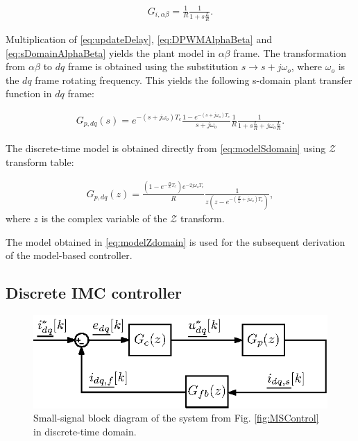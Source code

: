 \documentclass[conference]{IEEEtran}
\begin{document}
\begin{equation}
\begin{aligned}
G_{i,\alpha \beta} = \frac{1}{R} \frac{1}{1 + s \frac{L}{R}}.
\label{eq:sDomainAlphaBeta} 
\end{aligned}    
\end{equation}

Multiplication of \eqref{eq:updateDelay}, \eqref{eq:DPWMAlphaBeta} and \eqref{eq:sDomainAlphaBeta} yields the plant model in $\alpha \beta$ frame.
The transformation from $\alpha \beta$ to $dq$ frame is obtained using the substitution $s \rightarrow s + j \omega_o$, where $\omega_o$ is the $dq$ frame rotating frequency.
This yields the following s-domain plant transfer function in $dq$ frame:

\begin{equation}
\begin{aligned}
G_{p,dq}(s) = e^{-(s+j\omega_o) T_c} \frac{1-e^{-(s+j\omega_o) T_c}}{s+j\omega_o} \frac{1}{R} \frac{1}{1 + s \frac{L}{R} + j\omega_o \frac{L}{R}}.
\label{eq:modelSdomain} 
\end{aligned}    
\end{equation}
 
The discrete-time model is obtained directly from \eqref{eq:modelSdomain} using $\mathcal{Z}$ transform table:

\begin{equation}
\begin{aligned}
G_{p,dq}(z) = \frac{\left( 1 - e^{-\frac{R}{L}T_c}\right) e^{-2j\omega_o T_c}}{R} \frac{1}{z \left( z - e^{- \left( \frac{R}{L} + j\omega_o\right) T_c}\right)},
\label{eq:modelZdomain} 
\end{aligned}    
\end{equation}
where $z$ is the complex variable of the $\mathcal{Z}$ transform.

The model obtained in \eqref{eq:modelZdomain} is used for the subsequent derivation of the model-based controller.
 
\subsection{Discrete IMC controller}


\begin{figure}[t!]
    \centerline{\includegraphics[width=0.95\linewidth]{figures/small_signal.eps}}
    \caption{Small-signal block diagram of the system from Fig. \ref{fig:MSControl} in discrete-time domain.}
    \label{fig:SmallSignal}
\end{figure}
\end{document}
